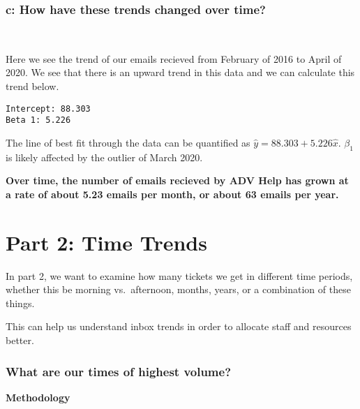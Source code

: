 \documentclass[11pt]{article}
\begin{document}
    \hypertarget{c-how-have-these-trends-changed-over-time}{%
\subsubsection{c: How have these trends changed over
time?}\label{c-how-have-these-trends-changed-over-time}}

    \begin{center}
    \end{center}
    { \hspace*{\fill} \\}
    
    Here we see the trend of our emails recieved from February of 2016 to
April of 2020. We see that there is an upward trend in this data and we
can calculate this trend below.


    \begin{Verbatim}[commandchars=\\\{\}]
Intercept: 88.303
Beta 1: 5.226
    \end{Verbatim}

    The line of best fit through the data can be quantified as
\(\hat{y} = 88.303 + 5.226\hat{x}\). \(\beta_1\) is likely affected by
the outlier of March 2020.

\textbf{Over time, the number of emails recieved by ADV Help has grown
at a rate of about 5.23 emails per month, or about 63 emails per year.}

    \hypertarget{part-2-time-trends}{%
\section{Part 2: Time Trends}\label{part-2-time-trends}}

In part 2, we want to examine how many tickets we get in different time
periods, whether this be morning vs.~afternoon, months, years, or a
combination of these things.

This can help us understand inbox trends in order to allocate staff and
resources better.

\hypertarget{what-are-our-times-of-highest-volume}{%
\subsubsection{What are our times of highest
volume?}\label{what-are-our-times-of-highest-volume}}

    \textbf{Methodology}
\end{document}
